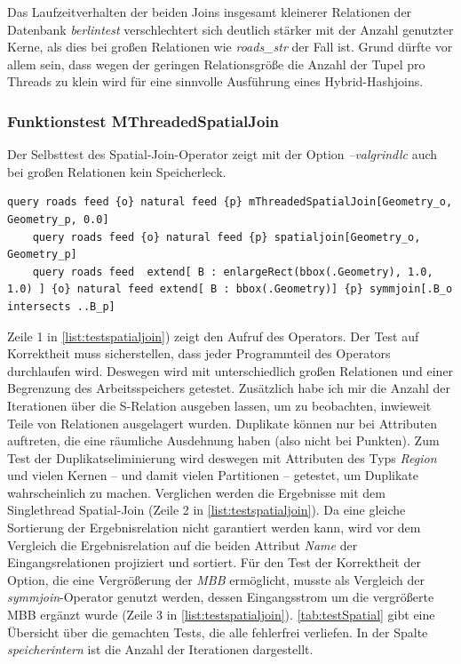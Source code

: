 \documentclass[a4paper,12pt,twoside]{article}
\newcommand{\Fb}[1]{\textit{#1}} %
\begin{document}
{Das Laufzeitverhalten der beiden Joins insgesamt kleinerer Relationen der Datenbank \Fb{berlintest} verschlechtert sich deutlich stärker mit der Anzahl genutzter Kerne, als dies bei großen Relationen wie \Fb{roads\_str} der Fall ist. Grund dürfte vor allem sein, dass wegen der geringen Relationsgröße die Anzahl der Tupel pro Threads zu klein wird für eine sinnvolle Ausführung eines Hybrid-Hashjoins.

\subsubsection{Funktionstest MThreadedSpatialJoin}

Der Selbsttest des Spatial-Join-Operator zeigt mit der Option \Fb{--valgrindlc} auch bei großen Relationen kein Speicherleck.

\begin{minipage}{\linewidth}
	\begin{lstlisting}[caption={Beispiel Testqueries für den Spatial-Join-Operator ohne \Fb{project} und \Fb{sortby}}, label=list:testspatialjoin]
	query roads feed {o} natural feed {p} mThreadedSpatialJoin[Geometry_o, Geometry_p, 0.0]
	query roads feed {o} natural feed {p} spatialjoin[Geometry_o, Geometry_p]
	query roads feed  extend[ B : enlargeRect(bbox(.Geometry), 1.0, 1.0) ] {o} natural feed extend[ B : bbox(.Geometry)] {p} symmjoin[.B_o intersects ..B_p]
	\end{lstlisting}
\end{minipage}

Zeile 1 in \autoref{list:testspatialjoin}) zeigt den Aufruf des Operators. Der Test auf Korrektheit muss sicherstellen, dass jeder Programmteil des Operators durchlaufen wird. Deswegen wird mit unterschiedlich großen Relationen und einer Begrenzung des Arbeitsspeichers getestet. Zusätzlich habe ich mir die Anzahl der Iterationen über die S-Relation ausgeben lassen, um zu beobachten, inwieweit Teile von Relationen ausgelagert wurden. Duplikate können nur bei Attributen auftreten, die eine räumliche Ausdehnung haben (also nicht bei Punkten). Zum Test der Duplikatseliminierung wird deswegen mit Attributen des Typs \Fb{Region} und vielen Kernen -- und damit vielen Partitionen -- getestet, um Duplikate wahrscheinlich zu machen. Verglichen werden die Ergebnisse mit dem Singlethread Spatial-Join (Zeile 2 in \autoref{list:testspatialjoin}). Da eine gleiche Sortierung der Ergebnisrelation nicht garantiert werden kann, wird vor dem Vergleich die Ergebnisrelation auf die beiden Attribut \Fb{Name} der Eingangsrelationen projiziert und sortiert. Für den Test der Korrektheit der Option, die eine Vergrößerung der \Fb{MBB} ermöglicht, musste als Vergleich der \Fb{symmjoin}-Operator genutzt werden, dessen Eingangsstrom um die vergrößerte MBB ergänzt wurde (Zeile 3 in \autoref{list:testspatialjoin}). \autoref{tab:testSpatial} gibt eine Übersicht über die gemachten Tests, die alle fehlerfrei verliefen. In der Spalte \Fb{speicherintern} ist die Anzahl der Iterationen dargestellt. 

}
\end{document}
